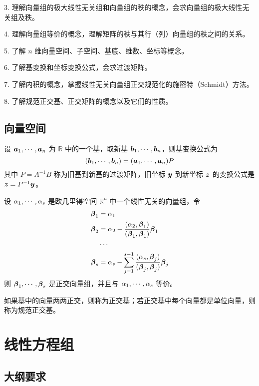 3. 理解向量组的极大线性无关组和向量组的秩的概念，会求向量组的极大线性无关组及秩。

4. 理解向量组等价的概念，理解矩阵的秩与其行（列）向量组的秩之间的关系。

5. 了解 $n$ 维向量空间、子空间、基底、维数、坐标等概念。

6. 了解基变换和坐标变换公式，会求过渡矩阵。

7. 了解内积的概念，掌握线性无关向量组正交规范化的施密特（Schmidt）方法。

8. 了解规范正交基、正交矩阵的概念以及它们的性质。

\subsection{向量空间}

设 $\boldsymbol{a}_1,\cdots,\boldsymbol{a}_n$ 为 $\mathbb{R}$ 中的一个基，取新基 $\boldsymbol{b}_1,\cdots,\boldsymbol{b}_n$，则基变换公式为
\[ (\boldsymbol{b}_1,\cdots,\boldsymbol{b}_n) =  (\boldsymbol{a}_1,\cdots,\boldsymbol{a}_n)P \]
其中 $P = A^{-1} B$ 称为旧基到新基的过渡矩阵，旧坐标 $\boldsymbol{y}$ 到新坐标 $\boldsymbol{z}$ 的变换公式是 $\boldsymbol{z} = P^{-1} \boldsymbol{y}$。

\begin{theorem}
	设 $\alpha_1,\cdots,\alpha_s$ 是欧几里得空间 $\mathbb{R}^n$ 中一个线性无关的向量组，令
	\[
		\begin{aligned}
			\boldsymbol{\beta}_1 & =\alpha_1                                                                                              \\
			\boldsymbol{\beta}_2 & =\alpha_2 - \frac{(\alpha_2,\boldsymbol{\beta}_1)}{(\boldsymbol{\beta}_1,\boldsymbol{\beta}_1)}\boldsymbol{\beta}_1                \\
			              & \cdots                                                                                                 \\
			\boldsymbol{\beta}_s & = \alpha_s-\sum_{j=1}^{s-1}\frac{(\alpha_s,\boldsymbol{\beta}_j)}{(\boldsymbol{\beta}_j,\boldsymbol{\beta}_j)}\boldsymbol{\beta}_j
		\end{aligned}
	\]
	则 $\boldsymbol{\beta}_1,\cdots,\boldsymbol{\beta}_s$ 是正交向量组，并且与 $\alpha_1,\cdots,\alpha_s$ 等价。
\end{theorem}

如果基中的向量两两正交，则称为正交基；若正交基中每个向量都是单位向量，则称为规范正交基。

\section{线性方程组}

\subsection{大纲要求}

